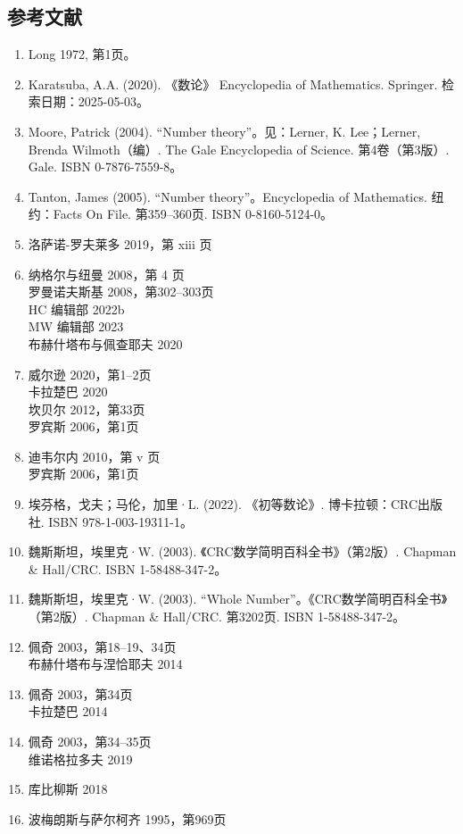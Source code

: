 \subsection{参考文献}
\begin{enumerate}
\item Long 1972, 第1页。
\item Karatsuba, A.A. (2020). 《数论》 Encyclopedia of Mathematics. Springer. 检索日期：2025-05-03。
\item Moore, Patrick (2004). “Number theory”。见：Lerner, K. Lee；Lerner, Brenda Wilmoth（编）. The Gale Encyclopedia of Science. 第4卷（第3版）. Gale. ISBN 0-7876-7559-8。
\item Tanton, James (2005). “Number theory”。Encyclopedia of Mathematics. 纽约：Facts On File. 第359–360页. ISBN 0-8160-5124-0。
\item 洛萨诺-罗夫莱多 2019，第 xiii 页\\
\item 纳格尔与纽曼 2008，第 4 页\\
罗曼诺夫斯基 2008，第302–303页\\
HC 编辑部 2022b\\
MW 编辑部 2023\\
布赫什塔布与佩查耶夫 2020
\item 威尔逊 2020，第1–2页\\
卡拉楚巴 2020\\
坎贝尔 2012，第33页\\
罗宾斯 2006，第1页
\item 迪韦尔内 2010，第 v 页\\
罗宾斯 2006，第1页
\item 埃芬格，戈夫；马伦，加里·L. (2022). 《初等数论》. 博卡拉顿：CRC出版社. ISBN 978-1-003-19311-1。
\item 魏斯斯坦，埃里克·W. (2003). 《CRC数学简明百科全书》（第2版）. Chapman & Hall/CRC. ISBN 1-58488-347-2。
\item 魏斯斯坦，埃里克·W. (2003). “Whole Number”。《CRC数学简明百科全书》（第2版）. Chapman & Hall/CRC. 第3202页. ISBN 1-58488-347-2。
\item 佩奇 2003，第18–19、34页\\
布赫什塔布与涅恰耶夫 2014
\item 佩奇 2003，第34页\\
卡拉楚巴 2014
\item 佩奇 2003，第34–35页\\
维诺格拉多夫 2019
\item 库比柳斯 2018
\item 波梅朗斯与萨尔柯齐 1995，第969页

\end{enumerate}
